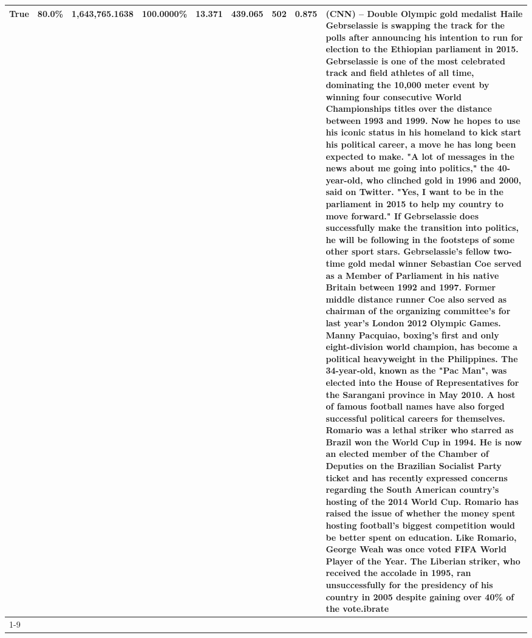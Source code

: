 \begin{table}[H]
{\begin{tabular}{lllrlllll}
True & 80.0\% & 1,643,765.1638 & \bfseries \color{red} 100.0000\% & 13.371 & 439.065 & 502 & 0.875 & (CNN) -- Double Olympic gold medalist Haile Gebrselassie is swapping the track for the polls after announcing his intention to run for election to the Ethiopian parliament in 2015. Gebrselassie is one of the most celebrated track and field athletes of all time, dominating the 10,000 meter event by winning four consecutive World Championships titles over the distance between 1993 and 1999. Now he hopes to use his iconic status in his homeland to kick start his political career, a move he has long been expected to make. "A lot of messages in the news about me going into politics," the 40-year-old, who clinched gold in 1996 and 2000, said on Twitter. "Yes, I want to be in the parliament in 2015 to help my country to move forward." If Gebrselassie does successfully make the transition into politics, he will be following in the footsteps of some other sport stars. Gebrselassie's fellow two-time gold medal winner Sebastian Coe served as a Member of Parliament in his native Britain between 1992 and 1997. Former middle distance runner Coe also served as chairman of the organizing committee's for last year's London 2012 Olympic Games. Manny Pacquiao, boxing's first and only eight-division world champion, has become a political heavyweight in the Philippines. The 34-year-old, known as the "Pac Man", was elected into the House of Representatives for the Sarangani province in May 2010. A host of famous football names have also forged successful political careers for themselves. Romario was a lethal striker who starred as Brazil won the World Cup in 1994. He is now an elected member of the Chamber of Deputies on the Brazilian Socialist Party ticket and has recently expressed concerns regarding the South American country's hosting of the 2014 World Cup. Romario has raised the issue of whether the money spent hosting football's biggest competition would be better spent on education. Like Romario, George Weah was once voted FIFA World Player of the Year. The Liberian striker, who received the accolade in 1995, ran unsuccessfully for the presidency of his country in 2005 despite gaining over 40\% of the vote.ibrate \\
\cline{1-9}

\end{tabular}}
\end{table}
